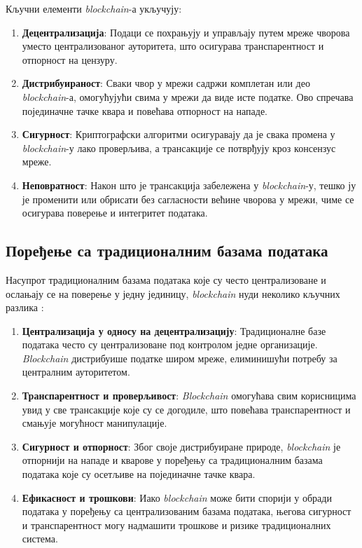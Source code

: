 \documentclass[12pt, a4paper]{article}
\begin{document}
Кључни елементи \textit{blockchain}-а укључују:
\begin{enumerate}
    \item \textbf{Децентрализација}: Подаци се похрањују и управљају путем мреже чворова уместо централизованог ауторитета, што осигурава транспарентност и отпорност на цензуру.
    \item  \textbf{Дистрибуираност}: Сваки чвор у мрежи садржи комплетан или део \textit{blockchain}-а, омогућујући свима у мрежи да виде исте податке. Ово спречава појединачне тачке квара и повећава отпорност на нападе.
    \item \textbf{Сигурност}: Криптографски алгоритми осигуравају да је свака промена у \textit{blockchain}-у лако проверљива, а трансакције се потврђују кроз консензус мреже.
    \item \textbf{Неповратност}: Након што је трансакција забележена у \textit{blockchain}-у, тешко ју је променити или обрисати без сагласности већине чворова у мрежи, чиме се осигурава поверење и интегритет података.
\end{enumerate}


\subsection{Поређење са традиционалним базама података}
Насупрот традиционалним базама података које су често централизоване и ослањају се на поверење у једну јединицу, \textit{blockchain} нуди неколико кључних разлика \cite{9}:
\begin{enumerate}
    \item \textbf{Централизација у односу на децентрализацију}: Традиционалне базе података често су централизоване под контролом једне организације. \textit{Blockchain} дистрибуише податке широм мреже, елиминишући потребу за централним ауторитетом.
    \item \textbf{Транспарентност и проверљивост}: \textit{Blockchain} омогућава свим корисницима увид у све трансакције које су се догодиле, што повећава транспарентност и смањује могућност манипулације.
    \item \textbf{Сигурност и отпорност}: Због своје дистрибуиране природе, \textit{blockchain} је отпорнији на нападе и кварове у поређењу са традиционалним базама података које су осетљиве на појединачне тачке квара.
    \item \textbf{Ефикасност и трошкови}: Иако \textit{blockchain} може бити спорији у обради података у поређењу са централизованим базама података, његова сигурност и транспарентност могу надмашити трошкове и ризике традиционалних система.
\end{enumerate}
\end{document}
